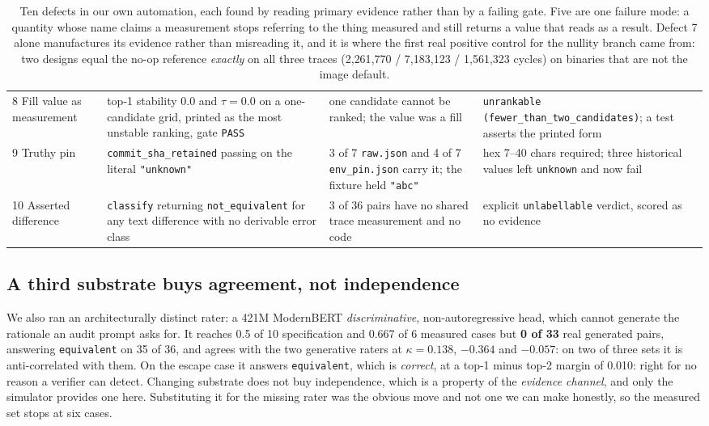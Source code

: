 \documentclass[sigconf,anonymous,nonacm]{acmart}
\begin{document}
\begin{table}[t]
\begin{tabular}{p{} p{} p{} p{}}
8 Fill value as measurement & top-1 stability $0.0$ and $\tau=0.0$ on a one-candidate grid, printed as the most unstable ranking, gate \texttt{PASS} & one candidate cannot be ranked; the value was a fill & \texttt{unrankable (fewer\_than\_two\_candidates)}; a test asserts the printed form \\
9 Truthy pin & \texttt{commit\_sha\_retained} passing on the literal \texttt{"unknown"} & 3 of 7 \texttt{raw.json} and 4 of 7 \texttt{env\_pin.json} carry it; the fixture held \texttt{"abc"} & hex 7--40 chars required; three historical values left \texttt{unknown} and now fail \\
10 Asserted difference & \texttt{classify} returning \texttt{not\_equivalent} for any text difference with no derivable error class & 3 of 36 pairs have no shared trace measurement and no code & explicit \texttt{unlabellable} verdict, scored as no evidence \\
\bottomrule
\end{tabular}
\vspace{-0.5em}
\caption{Ten defects in our own automation, each found by reading primary evidence rather than by a failing gate. Five are one failure mode: a quantity whose name claims a measurement stops referring to the thing measured and still returns a value that reads as a result. Defect 7 alone manufactures its evidence rather than misreading it, and it is where the first real positive control for the nullity branch came from: two designs equal the no-op reference \emph{exactly} on all three traces (2{,}261{,}770 / 7{,}183{,}123 / 1{,}561{,}323 cycles) on binaries that are not the image default.}
\label{tab:defects}
\end{table}

\subsection{A third substrate buys agreement, not independence}
\label{sec:substrate}

We also ran an architecturally distinct rater: a 421M ModernBERT \emph{discriminative}, non-autoregressive head, which cannot generate the rationale an audit prompt asks for. It reaches 0.5 of 10 specification and 0.667 of 6 measured cases but \textbf{0 of 33} real generated pairs, answering \texttt{equivalent} on 35 of 36, and agrees with the two generative raters at $\kappa=0.138$, $\mathbf{-0.364}$ and $-0.057$: on two of three sets it is anti-correlated with them. On the escape case it answers \texttt{equivalent}, which is \emph{correct}, at a top-1 minus top-2 margin of 0.010: right for no reason a verifier can detect. Changing substrate does not buy independence, which is a property of the \emph{evidence channel}, and only the simulator provides one here. Substituting it for the missing rater was the obvious move and not one we can make honestly, so the measured set stops at six cases.
\end{document}
